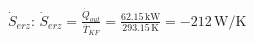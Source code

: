 \( \dot{S}_{erz} \):  
\(\dot{S}_{erz} = \frac{\dot{Q}_{out}}{\overline{T}_{KF}} = \frac{62.15 \, \text{kW}}{293.15 \, \text{K}} = -212 \, \text{W/K} \)